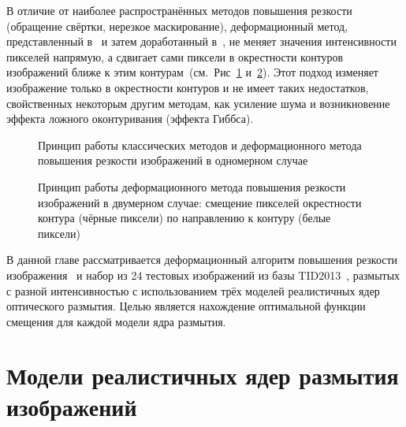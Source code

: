 В отличие от наиболее распространённых методов повышения резкости (обращение свёртки, нерезкое маскирование), деформационный метод, представленный в~\cite{krylov2014gridwarping} и затем доработанный в~\cite{nasonova2014deblurred, gusev2016parallel}, не меняет значения интенсивности пикселей напрямую, а сдвигает сами пиксели в окрестности контуров изображений ближе к этим контурам~(см.~Рис~\ref{fig:warping-warping-idea} и~\ref{fig:warp-idea}). Этот подход изменяет изображение только в окрестности контуров и не имеет таких недостатков, свойственных некоторым другим методам, как усиление шума и возникновение эффекта ложного оконтуривания (эффекта Гиббса).

\begin{figure}[ht]
	\caption{Принцип работы классических методов и деформационного метода повышения резкости изображений в одномерном случае}
	\label{fig:warping-warping-idea}
\end{figure}

\begin{figure}[ht]
	\caption{Принцип работы деформационного метода повышения резкости изображений в двумерном случае: смещение пикселей окрестности контура (чёрные пиксели) по направлению к контуру (белые пиксели)}
	\label{fig:warp-idea}
\end{figure}

В данной главе рассматривается деформационный алгоритм повышения резкости изображения~\cite{nasonova2014deblurred, gusev2016parallel} и набор из 24 тестовых изображений из базы TID2013~\cite{ponomarenko2015image}, размытых с разной интенсивностью с использованием трёх моделей реалистичных ядер оптического размытия. Целью является нахождение оптимальной функции смещения для каждой модели ядра размытия.%

\section{Модели реалистичных ядер размытия изображений}


